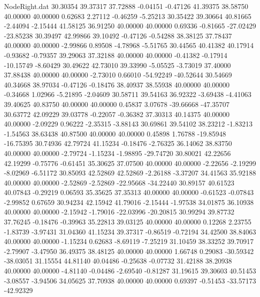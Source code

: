 \begin{filecontents}{NodeRight.dat}
  30.30354   39.37317   37.72888    -0.04151   -0.47126   41.39375   38.58750   40.00000   40.00000    0.62683    2.27112   -0.46259   -5.25213
  30.35422   39.30664   40.81665    -2.44094   -2.15444   41.58125   36.91250   40.00000   40.00000    0.69336   -0.81665  -27.02429  -23.85238
  30.39497   42.99866   39.10492    -0.47126   -0.54288   38.38125   37.78437   40.00000   40.00000   -2.99866    0.89508   -4.78968   -5.51765
  30.44565   40.41382   40.17914    -0.93682   -0.79357   39.29063   37.32188   40.00000   40.00000   -0.41382   -0.17914  -10.15749   -8.60429
  30.49622   42.73010   39.33990    -5.05525   -3.73019   37.40000   37.88438   40.00000   40.00000   -2.73010    0.66010  -54.92249  -40.52644
  30.54669   40.34668   38.97034    -0.47126   -0.18476   38.40937   38.55938   40.00000   40.00000   -0.34668    1.02966   -5.21895   -2.04609
  30.58711   39.54163   36.92322    -3.69438   -4.41063   39.40625   40.83750   40.00000   40.00000    0.45837    3.07678  -39.66668  -47.35707
  30.63772   42.09229   39.03778    -0.22057   -0.36382   37.30313   40.14375   40.00000   40.00000   -2.09229    0.96222   -2.35315   -3.88143
  30.69861   39.54102   38.23212    -1.83213   -1.54563   38.63438   40.87500   40.00000   40.00000    0.45898    1.76788  -19.85948  -16.75395
  30.74936   42.79724   41.15234    -0.18476   -2.76325   36.14062   38.83750   40.00000   40.00000   -2.79724   -1.15234   -1.98895  -29.74720
  30.80021   42.22656   42.19299    -0.75776   -0.61451   35.30625   37.07500   40.00000   40.00000   -2.22656   -2.19299   -8.02969   -6.51172
  30.85093   42.52869   42.52869    -2.26188   -3.37207   34.41563   35.92188   40.00000   40.00000   -2.52869   -2.52869  -22.95668  -34.22440
  30.89157   40.61523   40.07843    -0.29219    0.06593   35.35625   37.35313   40.00000   40.00000   -0.61523   -0.07843   -2.99852    0.67659
  30.94234   42.15942   41.79016    -2.15444   -1.97538   34.01875   36.10938   40.00000   40.00000   -2.15942   -1.79016  -22.03996  -20.20815
  30.99294   39.87732   37.76245    -0.18476   -0.39963   35.22813   39.03125   40.00000   40.00000    0.12268    2.23755   -1.83739   -3.97431
  31.04360   41.15234   39.37317    -0.86519   -0.72194   34.42500   38.84063   40.00000   40.00000   -1.15234    0.62683   -8.69119   -7.25219
  31.10459   38.33252   39.70917    -2.79907   -3.47950   36.49375   38.48125   40.00000   40.00000    1.66748    0.29083  -30.59342  -38.03051
  31.15554   44.81140   40.04486    -0.25638   -0.07732   31.42188   38.20938   40.00000   40.00000   -4.81140   -0.04486   -2.69540   -0.81287
  31.19615   39.30603   40.51453    -3.08557   -3.94506   34.05625   37.70938   40.00000   40.00000    0.69397   -0.51453  -33.57173  -42.92329

\end{filecontents}
